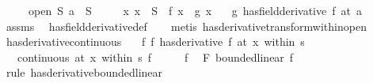 \begin{isabellebody}
\ \ \ \ \ {\isachardoublequoteopen}open\ S{\isachardoublequoteclose}\ {\isachardoublequoteopen}a\ {\isasymin}\ S{\isachardoublequoteclose}\isanewline
\ \ \ \ \ {\isachardoublequoteopen}{\isasymAnd}x{\isachardot}{\kern0pt}\ x\ {\isasymin}\ S\ {\isasymLongrightarrow}\ f\ x\ {\isacharequal}{\kern0pt}\ g\ x{\isachardoublequoteclose}\isanewline
\ \ \ {\isachardoublequoteopen}{\isacharparenleft}{\kern0pt}g\ has{\isacharunderscore}{\kern0pt}field{\isacharunderscore}{\kern0pt}derivative\ f{\isacharprime}{\kern0pt}{\isacharparenright}{\kern0pt}\ {\isacharparenleft}{\kern0pt}at\ a{\isacharparenright}{\kern0pt}{\isachardoublequoteclose}\isanewline
%
\isadelimproof
\ \ %
\endisadelimproof
%
\isatagproof
{}\isamarkupfalse%
\ assms\ \isamarkupfalse%
\ has{\isacharunderscore}{\kern0pt}field{\isacharunderscore}{\kern0pt}derivative{\isacharunderscore}{\kern0pt}def\isanewline
\ \ \isamarkupfalse%
\ {\isacharparenleft}{\kern0pt}metis\ has{\isacharunderscore}{\kern0pt}derivative{\isacharunderscore}{\kern0pt}transform{\isacharunderscore}{\kern0pt}within{\isacharunderscore}{\kern0pt}open{\isacharparenright}{\kern0pt}%
\endisatagproof
{\isafoldproof}%
%
\isadelimproof
%
\endisadelimproof
%
\isadelimdocument
%
\endisadelimdocument
%
\isatagdocument
%
\isamarkuptrue%
%
\endisatagdocument
{\isafolddocument}%
%
\isadelimdocument
%
\endisadelimdocument
{}\isamarkupfalse%
\ has{\isacharunderscore}{\kern0pt}derivative{\isacharunderscore}{\kern0pt}continuous{\isacharcolon}{\kern0pt}\isanewline
\ \ \ f{\isacharcolon}{\kern0pt}\ {\isachardoublequoteopen}{\isacharparenleft}{\kern0pt}f\ has{\isacharunderscore}{\kern0pt}derivative\ f{\isacharprime}{\kern0pt}{\isacharparenright}{\kern0pt}\ {\isacharparenleft}{\kern0pt}at\ x\ within\ s{\isacharparenright}{\kern0pt}{\isachardoublequoteclose}\isanewline
\ \ \ {\isachardoublequoteopen}continuous\ {\isacharparenleft}{\kern0pt}at\ x\ within\ s{\isacharparenright}{\kern0pt}\ f{\isachardoublequoteclose}\isanewline
%
\isadelimproof
%
\endisadelimproof
%
\isatagproof
{}\isamarkupfalse%
\ {\isacharminus}{\kern0pt}\isanewline
\ \ \isamarkupfalse%
\ f\ \isamarkupfalse%
\ F{\isacharcolon}{\kern0pt}\ bounded{\isacharunderscore}{\kern0pt}linear\ f{\isacharprime}{\kern0pt}\isanewline
\ \ \ \ \isamarkupfalse%
\ {\isacharparenleft}{\kern0pt}rule\ has{\isacharunderscore}{\kern0pt}derivative{\isacharunderscore}{\kern0pt}bounded{\isacharunderscore}{\kern0pt}linear{\isacharparenright}{\kern0pt}\isanewline

\end{isabellebody}
